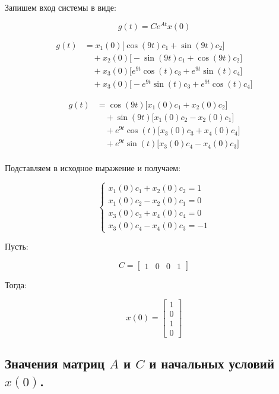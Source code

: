 \documentclass[a5paper, 10pt]{article}
\theoremstyle{definition}
\theoremstyle{plain}
\theoremstyle{remark}
\begin{document}
Запишем вход системы в виде:

$$
g(t)=Ce^{At}x(0)
$$

$$
\begin{aligned}
g(t) &= x_1(0)\bigl[\cos(9t)c_1 + \sin(9t)c_2\bigr] \\
     &\quad + x_2(0)\bigl[-\sin(9t)c_1 + \cos(9t)c_2\bigr] \\
     &\quad +x_3(0)\bigl[ e^{9t}\cos(t)c_3+e^{9t}\sin(t)c_4 \bigr]\\
     &\quad +x_3(0)\bigl[ -e^{9t}\sin(t)c_3+e^{9t}\cos(t)c_4 \bigr]
\end{aligned}
$$

\vspace{0.3cm}

$$
\begin{aligned}
g(t) &=\cos(9t)\bigl[x_1(0)c_1+x_2(0)c_2\bigr]\\ 
     &\quad +\sin(9t)\bigl[x_1(0)c_2-x_2(0)c_1\bigr]\\ 
     &\quad + e^{9t}\cos(t)\bigl[x_3(0)c_3+x_4(0)c_4\bigr]\\
     &\quad + e^{9t}\sin(t)\bigl[x_3(0)c_4-x_4(0)c_3\bigr]\\
\end{aligned}
$$

Подставляем в исходное выражение и получаем:

$$
\begin{cases}
    x_1(0)c_1+x_2(0)c_2=1\\
    x_1(0)c_2-x_2(0)c_1=0\\
    x_3(0)c_3+x_4(0)c_4=0\\
    x_3(0)c_4-x_4(0)c_3=-1
\end{cases}
$$

Пусть:

$$
C=\begin{bmatrix}
    1 & 0 & 0 & 1
\end{bmatrix}
$$

Тогда:

$$
x(0)=\begin{bmatrix}
    1\\
    0\\
    1\\
    0
\end{bmatrix}
$$

\subsection{Значения матриц $A$ и $C$ и начальных условий $x(0)$.}
\end{document}
